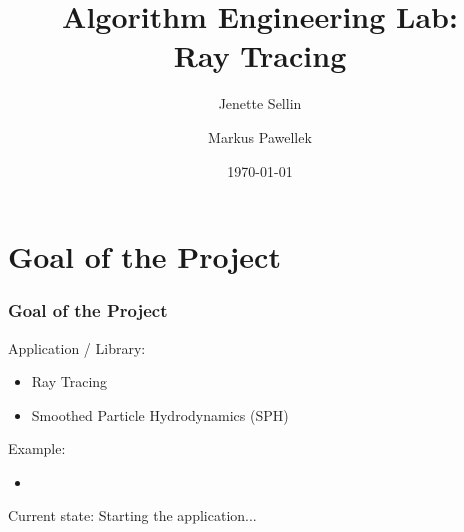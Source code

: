 \documentclass[aspectratio=169]{beamer}
\title[Algorithm Engineering Lab: Ray Tracing]{%
  Algorithm Engineering Lab: \\ Ray Tracing
}
\author[Sellin, Pawellek]{%
  Jenette Sellin \and Markus Pawellek%
}
\date{\today}
\begin{document}
  \frame{\titlepage}

  \section{Goal of the Project} %
  \label{sec:goal_of_the_project}
  \begin{frame}
    \frametitle{Goal of the Project}
    Application / Library:
    \begin{itemize}
      \item Ray Tracing
      \item Smoothed Particle Hydrodynamics (SPH)
    \end{itemize}
    \bigskip
    Example:
    \begin{itemize}
      \item \href{https://www.youtube.com/watch?v=h5mRRElXy-w}{}
    \end{itemize}
    \bigskip
    Current state: Starting the application...
  \end{frame}
\end{document}

